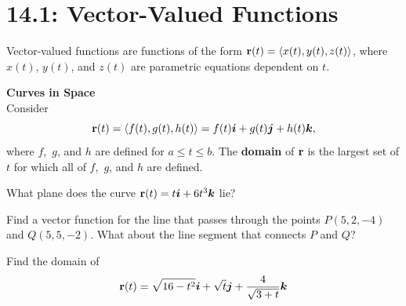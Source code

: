 \documentclass[../mathNotesPreamble]{subfiles}
\begin{document}
\section{14.1: Vector-Valued Functions}

  Vector-valued functions are functions of the form ${\mathbf{r}}(t)={\left\langle x(t),y(t),z(t) \right\rangle}$, where $x(t)$, $y(t)$, and $z(t)$ are parametric equations dependent on $t$.
  
  \begin{center}
  \end{center}
  
  \textbf{Curves in Space}\\
  Consider 
    \[{\mathbf{r}}(t)={\left\langle f(t),g(t),h(t) \right\rangle}=f(t){\bm{i}}+g(t){\bm{j}}+h(t){\bm{k}},\]
  where $f$,\ $g$, and $h$ are defined for $a\leq t\leq b$. The
  \textbf{domain} of ${\mathbf{r}}$ is the largest set of $t$ for which all of
  $f$,\ $g$, and $h$ are defined.
  \vspace*{\baselineskip}

  \begin{ex*}
    What plane does the curve ${\mathbf{r}}(t)=t{\bm{i}}+6t^3{\bm{k}}$ lie?
  \end{ex*}

  \begin{ex*}
    Find a vector function for the line that passes through the points $P(5,2,-4)$ and $Q(5,5,-2)$. What about the line segment that connects $P$ and $Q$?
  \end{ex*}
  \pagebreak

  \begin{ex*}
    Find the domain of
      \[{\mathbf{r}}(t)=\sqrt{16-t^2}{\bm{i}}+\sqrt{t}{\bm{j}}+\frac{4}{\sqrt{3+t}}{\bm{k}}\]
  \end{ex*}
\end{document}
